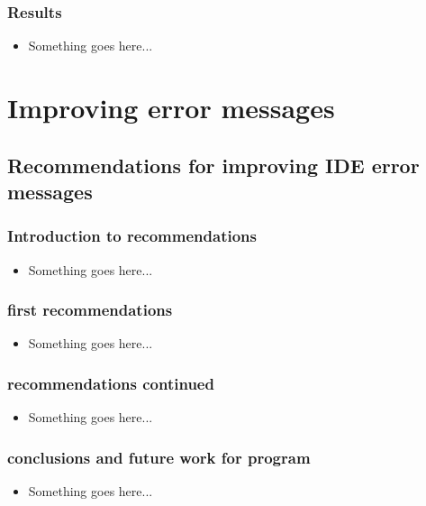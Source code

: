 \documentclass{beamer}
\begin{document}
\begin{frame}
	\frametitle{Results}
		\begin{itemize}
			\item Something goes here...
		\end{itemize}

\end{frame}

\section[Improving error messages]{Improving error messages}

\subsection[DrRacket recommendations]{Recommendations for improving IDE error messages}

\begin{frame}
	\frametitle{Introduction to recommendations}
		\begin{itemize}
			\item Something goes here...
		\end{itemize}

\end{frame}

\begin{frame}
	\frametitle{first recommendations}
		\begin{itemize}
			\item Something goes here...
		\end{itemize}

\end{frame}

\begin{frame}
	\frametitle{recommendations continued}
		\begin{itemize}
			\item Something goes here...
		\end{itemize}

\end{frame}

\begin{frame}
	\frametitle{conclusions and future work for program}
		\begin{itemize}
			\item Something goes here...
		\end{itemize}

\end{frame}
\end{document}
